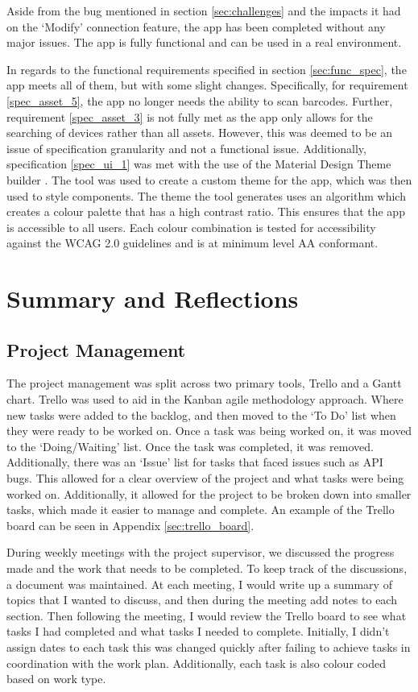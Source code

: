 \documentclass [11pt,a4paper]{article}
\begin{document}
Aside from the bug mentioned in section \ref{sec:challenges} and the impacts it had on the `Modify' connection feature, the app has been completed without any major issues. The app is fully functional and can be used in a real environment. 

In regards to the functional requirements specified in section \ref{sec:func_spec}, the app meets all of them, but with some slight changes. Specifically, for requirement \ref{spec_asset_5}, the app no longer needs the ability to scan barcodes. Further, requirement \ref{spec_asset_3} is not fully met as the app only allows for the searching of devices rather than all assets. However, this was deemed to be an issue of specification granularity and not a functional issue. Additionally, specification \ref{spec_ui_1} was met with the use of the Material Design Theme builder \cite{material3ColourTool}. The tool was used to create a custom theme for the app, which was then used to style components. The theme the tool generates uses an algorithm which creates a colour palette that has a high contrast ratio. This ensures that the app is accessible to all users. Each colour combination is tested for accessibility against the WCAG 2.0 guidelines \cite{caldwell2008web} and is at minimum level AA conformant.
\pagebreak
\section{Summary and Reflections}
\label{sec:summary}
\subsection{Project Management}
\label{sec:project_management_summary}

The project management was split across two primary tools, Trello and a Gantt chart. Trello was used to aid in the Kanban agile methodology approach. Where new tasks were added to the backlog, and then moved to the `To Do' list when they were ready to be worked on. Once a task was being worked on, it was moved to the `Doing/Waiting' list. Once the task was completed, it was removed. Additionally, there was an `Issue' list for tasks that faced issues such as API bugs. This allowed for a clear overview of the project and what tasks were being worked on. Additionally, it allowed for the project to be broken down into smaller tasks, which made it easier to manage and complete. An example of the Trello board can be seen in Appendix \ref{sec:trello_board}.

During weekly meetings with the project supervisor, we discussed the progress made and the work that needs to be completed. To keep track of the discussions, a document was maintained. At each meeting, I would write up a summary of topics that I wanted to discuss, and then during the meeting add notes to each section. Then following the meeting, I would review the Trello board to see what tasks I had completed and what tasks I needed to complete. Initially, I didn't assign dates to each task this was changed quickly after failing to achieve tasks in coordination with the work plan. Additionally, each task is also colour coded based on work type.
\end{document}
